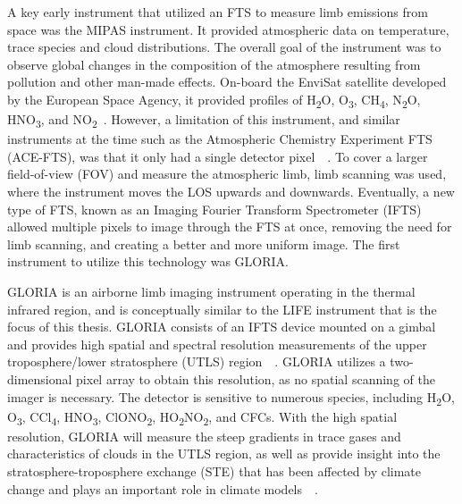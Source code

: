 A key early instrument that utilized an FTS to measure limb emissions from space was the MIPAS instrument. It provided atmospheric data on temperature, trace species and cloud distributions. The overall goal of the instrument was to observe global changes in the composition of the atmosphere resulting from pollution and other man-made effects. On-board the EnviSat satellite developed by the European Space Agency, it provided profiles of H\textsubscript{2}O, O\textsubscript{3}, CH\textsubscript{4}, N\textsubscript{2}O, HNO\textsubscript{3}, and NO\textsubscript{2}~\citep{MIPAS_instrument}. However, a limitation of this instrument, and similar instruments at the time such as the Atmospheric Chemistry Experiment FTS (ACE-FTS), was that it only had a single detector pixel~\citep{SPARC}~\citep{ACE_conference}. To cover a larger field-of-view (FOV) and measure the atmospheric limb, limb scanning was used, where the instrument moves the LOS upwards and downwards. Eventually, a new type of FTS, known as an Imaging Fourier Transform Spectrometer (IFTS) allowed multiple pixels to image through the FTS at once, removing the need for limb scanning, and creating a better and more uniform image. The first instrument to utilize this technology was GLORIA.

GLORIA is an airborne limb imaging instrument operating in the thermal infrared region, and is conceptually similar to the LIFE instrument that is the focus of this thesis. GLORIA consists of an IFTS device mounted on a gimbal and provides high spatial and spectral resolution measurements of the upper troposphere/lower stratosphere (UTLS) region~\citep{GLORIA_concept}~\citep{GLORIA_PhD}. GLORIA utilizes a two-dimensional pixel array to obtain this resolution, as no spatial scanning of the imager is necessary. The detector is sensitive to numerous species, including H\textsubscript{2}O, O\textsubscript{3}, CCl\textsubscript{4}, HNO\textsubscript{3}, ClONO\textsubscript{2}, HO\textsubscript{2}NO\textsubscript{2}, and CFCs. With the high spatial resolution, GLORIA will measure the steep gradients in trace gases and characteristics of clouds in the UTLS region, as well as provide insight into the stratosphere-troposphere exchange (STE) that has been affected by climate change and plays an important role in climate models~\citep{GLORIA_PhD}~\citep{GLORIA_objectives}.

